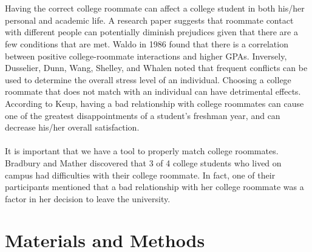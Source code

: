 \documentclass[journal]{./IEEE/IEEEtran}
\begin{document}
    \\
    \\
    Having the correct college roommate can affect a college student in both his/her personal and academic life. A research paper suggests that roommate contact with different people can potentially diminish prejudices given that there are a few conditions that are met. Waldo in 1986 found that there is a correlation between positive college-roommate interactions and higher GPAs. Inversely, Dusselier, Dunn, Wang, Shelley, and Whalen noted that frequent conflicts can be used to determine the overall stress level of an individual\cite{dusselier}. Choosing a college roommate that does not match with an individual can have detrimental effects. According to Keup, having a bad relationship with college roommates can cause one of the greatest disappointments of a student’s freshman year, and can decrease his/her overall satisfaction\cite{keup}.
    \\
    \\
    It is important that we have a tool to properly match college roommates. Bradbury and Mather discovered that 3 of 4 college students who lived on campus had difficulties with their college roommate. In fact, one of their participants mentioned that a bad relationship with her college roommate was a factor in her decision
    to leave the university\cite{bradbury}.

\section{Materials and Methods}
\end{document}
